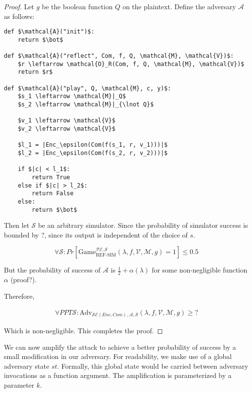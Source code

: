 \documentclass{article}
\begin{document}
\begin{proof}

Let $g$ be the boolean function $Q$ on the plaintext. Define the adversary
$\mathcal{A}$ as follows:

\begin{lstlisting}[texcl,mathescape]
def $\mathcal{A}("init")$:
    return $\bot$

def $\mathcal{A}("reflect", Com, f, Q, \mathcal{M}, \mathcal{V})$:
    $r \leftarrow \mathcal{O}_R(Com, f, Q, \mathcal{M}, \mathcal{V})$
    return $r$

def $\mathcal{A}("play", Q, \mathcal{M}, c, y)$:
    $s_1 \leftarrow \mathcal{M}|_Q$
    $s_2 \leftarrow \mathcal{M}|_{\lnot Q}$

    $v_1 \leftarrow \mathcal{V}$
    $v_2 \leftarrow \mathcal{V}$

    $l_1 = |Enc_\epsilon(Com(f(s_1, r, v_1)))|$
    $l_2 = |Enc_\epsilon(Com(f(s_2, r, v_2)))|$
    
    if $|c| < l_1$:
        return True
    else if $|c| > l_2$:
        return False
    else:
        return $\bot$
\end{lstlisting}

Then let $\mathcal{S}$ be an arbitrary simulator. Since the probability of simulator
success is bounded by $?$, since its output is independent of the choice of
$s$.

\begin{equation}
    \forall \mathcal{S}:
    Pr[\text{Game}_{\text{REF-SIM}}^{\mathcal{PE},\mathcal{S}}(\lambda, f, \mathcal{V}, \mathcal{M}, g) = 1] \leq 0.5
\end{equation}

But the probability of success of $\mathcal{A}$ is $\frac{1}{2} + \alpha(\lambda)$ for some non-negligible function $\alpha$ (proof?).

Therefore,

\begin{equation}
\begin{split}
    \forall PPT \mathcal{S}:
    \text{Adv}_{\mathcal{SE}(Enc, Com), \mathcal{A}, \mathcal{S}}(\lambda, f, \mathcal{V}, \mathcal{M}, g) \geq ?
\end{split}
\end{equation}

Which is non-negligible. This completes the proof.

\end{proof}

We can now amplify the attack to achieve a better probability of success by a small modification in our adversary. For readability, we make use of a global adversary state $st$. Formally, this global state would be carried between adversary invocations as a function argument. The amplification is parameterized by a parameter $k$.
\end{document}
